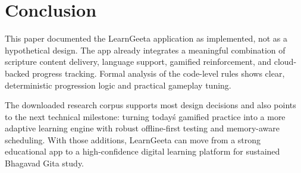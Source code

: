 \documentclass[conference]{IEEEtran}
\begin{document}
\section{Conclusion}
This paper documented the LearnGeeta application as implemented, not as a hypothetical design. The app already integrates a meaningful combination of scripture content delivery, language support, gamified reinforcement, and cloud-backed progress tracking. Formal analysis of the code-level rules shows clear, deterministic progression logic and practical gameplay tuning.

The downloaded research corpus supports most design decisions and also points to the next technical milestone: turning today\'s gamified practice into a more adaptive learning engine with robust offline-first testing and memory-aware scheduling. With those additions, LearnGeeta can move from a strong educational app to a high-confidence digital learning platform for sustained Bhagavad Gita study.
\end{document}
